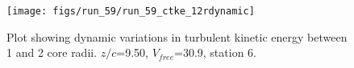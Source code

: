 \begin{figure}[H]
\centering
\texttt{[image: figs/run\_59/run\_59\_ctke\_12rdynamic]}
\caption{Plot showing dynamic variations in turbulent kinetic energy between 1 and 2 core radii. $z/c$=9.50, $V_{free}$=30.9, station 6.}
\end{figure}


